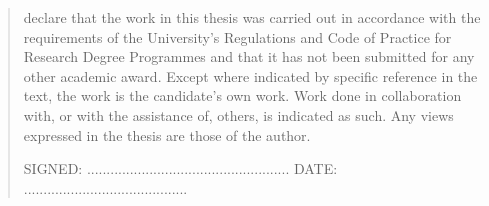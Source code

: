 \documentclass{mimosis-class/mimosis}
\numberwithin{equation}{chapter}
\begin{document}
\label{sec:orge3d7c5b}
\begin{singlespace}
\begin{quote}
 declare that the work in this thesis was carried out in accordance with the requirements of  the University's Regulations and Code of Practice for Research Degree Programmes and that it  has not been submitted for any other academic award. Except where indicated by specific  reference in the text, the work is the candidate's own work. Work done in collaboration with, or with the assistance of, others, is indicated as such. Any views expressed in the thesis are those of the author.

\vspace{1.5cm}
\noindent
\hspace{-0.75cm}\textsc{SIGNED: .................................................... DATE: ..........................................}
\end{quote}
\end{singlespace}
\end{document}
